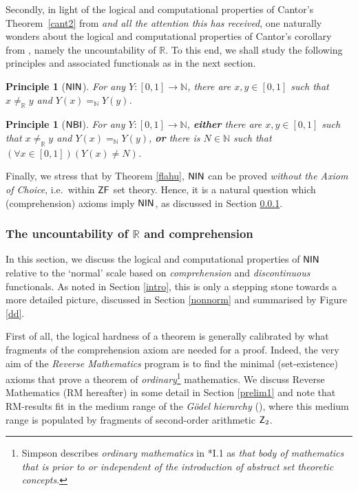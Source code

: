 \documentclass[reqno]{amsart}
\newtheorem{princ}[thm]{Principle}
\def\Z{\textup{\textsf{Z}}}
\def\ZF{\textup{\textsf{ZF}}}
\def\N{{\mathbb  N}}
\def\R{{\mathbb  R}}
\def\di{\rightarrow}
\def\NBI{\textup{\textsf{NBI}}}
\def\NIN{\textup{\textsf{NIN}}}
\numberwithin{equation}{section}
\numberwithin{thm}{section}
\begin{document}
\smallskip

Secondly, in light of the logical and computational properties of Cantor's Theorem~\ref{cant2} from \cite{cantor1} \emph{and all the attention this has received}, one naturally wonders about the logical and computational properties of Cantor's corollary from \cite{cantor1}, namely the uncountability of $\R$.  To this end, we shall study the following principles and associated functionals as in the next section.  
\begin{princ}[$\NIN$]
For any $Y:[0,1]\di \N$, there are $x, y\in [0,1]$ such that $x\ne_{\R} y$ and $Y(x)=_{\N}Y(y)$. 
\end{princ}
\begin{princ}[$\NBI$]
For any $Y:[0,1]\di \N$, \textbf{either} there are $x, y\in [0,1]$ such that $x\ne_{\R} y$ and $Y(x)=_{\N}Y(y)$, \textbf{or} there is $N\in \N$ such that $(\forall x\in [0,1])(Y(x)\ne N)$.
\end{princ}
Finally, we stress that by Theorem \ref{flahu}, $\NIN$ can be proved \emph{without the Axiom of Choice}, i.e.\ within $\ZF$ set theory.
Hence, it is a natural question which (comprehension) axioms imply $\NIN$, as discussed in Section \ref{norm}.

\subsubsection{The uncountability of $\R$ and comprehension}\label{norm}
In this section, we discuss the logical and computational properties of $\NIN$ relative to the `normal' scale based on \emph{comprehension} and \emph{discontinuous} functionals.  
As noted in Section \ref{intro}, this is only a stepping stone towards a more detailed picture, discussed in Section \ref{nonnorm} and summarised by Figure \ref{dd}. 

\smallskip

First of all, the logical hardness of a theorem is generally calibrated by what fragments of the comprehension axiom are needed for a proof.  
Indeed, the very aim of the \emph{Reverse Mathematics} program is to find the minimal (set-existence) axioms that prove a theorem of \emph{ordinary}\footnote{Simpson describes \emph{ordinary mathematics} in \cite{simpson2}*{I.1} as \emph{that body of mathematics that is prior to or independent of the introduction of abstract set theoretic concepts}.} mathematics.  
We discuss Reverse Mathematics (RM hereafter) in some detail in Section \ref{prelim1} and note that RM-results fit in the medium range of the
 \emph{G\"odel hierarchy} (\cite{sigohi}), where this medium range is populated by fragments of second-order arithmetic $\Z_{2}$.
\end{document}
